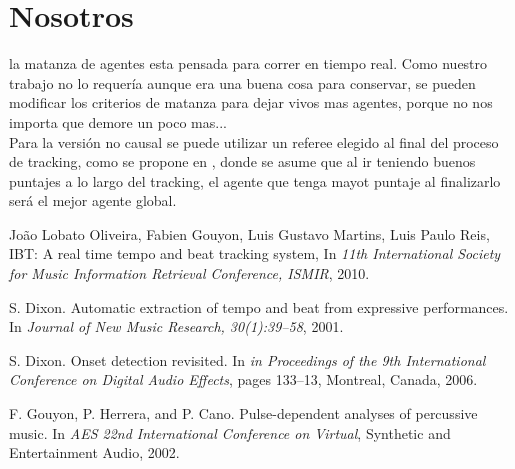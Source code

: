 \documentclass[12pt,a4paper,titlepage]{report}
\begin{document}
\chapter{Nosotros}

la matanza de agentes esta pensada para correr en tiempo real. Como nuestro trabajo no lo requería aunque era una buena cosa para conservar, se pueden modificar los criterios de matanza para dejar vivos mas agentes, porque no nos importa que demore un poco mas...\\

Para la versión no causal se puede utilizar un referee elegido al final del proceso de tracking, como se propone en \cite{bib:dixon}, donde se asume que al ir teniendo buenos puntajes a lo largo del tracking, el agente que tenga mayot puntaje al finalizarlo será el mejor agente global.


\begin{thebibliography}{99}
\begin{small}

Jo\~ao Lobato Oliveira, Fabien Gouyon, Luis Gustavo Martins, Luis Paulo Reis, IBT: A real time tempo and beat tracking system, In \emph{11th International Society for Music Information Retrieval Conference, ISMIR}, 2010.

S. Dixon. Automatic extraction of tempo and beat from
expressive performances. In \emph{Journal of New Music Research, 30(1):39–58}, 2001.

S. Dixon. Onset detection revisited. In \emph{in Proceedings of the 9th International Conference on Digital Audio Effects}, pages 133–13, Montreal, Canada, 2006.

F. Gouyon, P. Herrera, and P. Cano. Pulse-dependent analyses of percussive music. In \emph{AES 22nd International Conference on Virtual}, Synthetic and Entertainment Audio, 2002.

\end{small}
\end{thebibliography}
\end{document}
